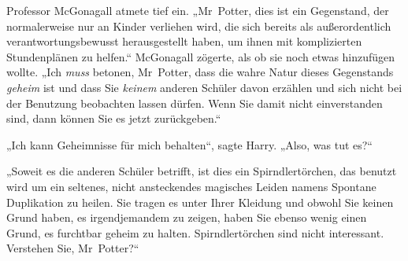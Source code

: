 Professor McGonagall atmete tief ein. „Mr~Potter, dies ist ein Gegenstand, der normalerweise nur an Kinder verliehen wird, die sich bereits als außerordentlich verantwortungsbewusst herausgestellt haben, um ihnen mit komplizierten Stundenplänen zu helfen.“ McGonagall zögerte, als ob sie noch etwas hinzufügen wollte. „Ich \emph{muss} betonen, Mr~Potter, dass die wahre Natur dieses Gegenstands \emph{geheim} ist und dass Sie \emph{keinem} anderen Schüler davon erzählen und sich nicht bei der Benutzung beobachten lassen dürfen. Wenn Sie damit nicht einverstanden sind, dann können Sie es jetzt zurückgeben.“

„Ich kann Geheimnisse für mich behalten“, sagte Harry. „Also, was tut es?“

„Soweit es die anderen Schüler betrifft, ist dies ein Spirndlertörchen, das benutzt wird um ein seltenes, nicht ansteckendes magisches Leiden namens Spontane Duplikation zu heilen. Sie tragen es unter Ihrer Kleidung und obwohl Sie keinen Grund haben, es irgendjemandem zu zeigen, haben Sie ebenso wenig einen Grund, es furchtbar geheim zu halten. Spirndlertörchen sind nicht interessant. Verstehen Sie, Mr~Potter?“

